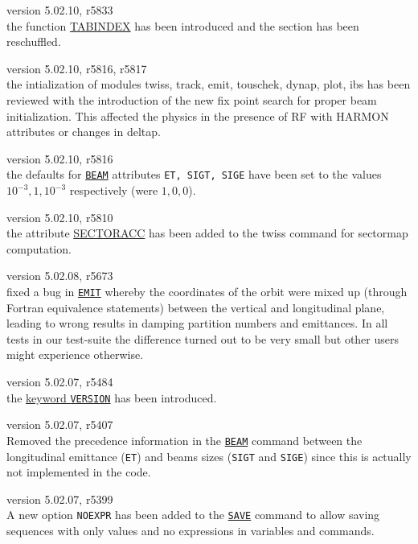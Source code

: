 \begin{madlist}
   version 5.02.10, r5833\\
  the function \hyperref[subsubsec:table]{TABINDEX} has been introduced and the section has been reschuffled.

   version 5.02.10, r5816, r5817\\
  the intialization of modules twiss, track, emit, touschek, dynap, plot, ibs has been reviewed with the introduction of the new fix point search for proper beam initialization. This affected the physics in the presence of RF with HARMON attributes or changes in deltap.

   version 5.02.10, r5816\\
  the defaults for \hyperref[sec:beam]{\texttt{BEAM}} attributes \texttt{ET, SIGT, SIGE} have been set to the values $10^{-3}, 1, 10^{-3}$ respectively (were $1, 0, 0$).

   version 5.02.10, r5810\\
  the attribute \hyperref[chap:twiss]{SECTORACC} has been added to the twiss command for sectormap computation.

   version 5.02.08, r5673\\
  fixed a bug in \hyperref[chap:emit]{\texttt{EMIT}} whereby the
  coordinates of the orbit were mixed up (through Fortran equivalence
  statements) between the vertical and longitudinal plane, leading to
  wrong results in damping partition numbers and emittances. In all tests
  in our test-suite the difference turned out to be very small but other
  users might experience otherwise.

   version 5.02.07, r5484\\
  the \hyperref[subsec:keyword]{keyword \texttt{VERSION}} has been introduced.
  
   version 5.02.07, r5407\\
  Removed the precedence information in the \hyperref[sec:beam]{\texttt{BEAM}} 
  command between the longitudinal emittance (\texttt{ET}) and beams sizes 
  (\texttt{SIGT} and \texttt{SIGE}) since this is actually not implemented in the 
  code.
  
   version 5.02.07, r5399\\
  A new option \texttt{NOEXPR} has been added to the
  \hyperref[sec:save]{\texttt{SAVE}} command to allow saving sequences
  with only values and no expressions in variables and commands.
  

\end{madlist}
